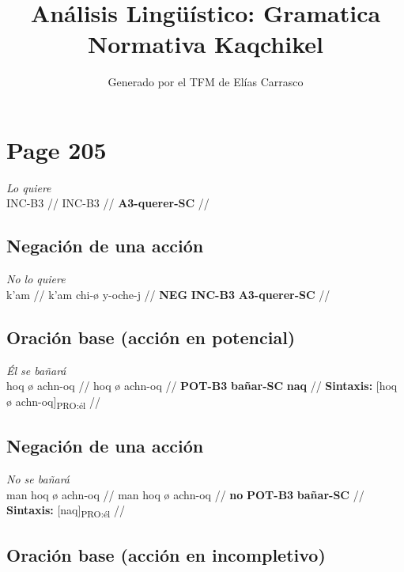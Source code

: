 \documentclass{article}%
\title{Análisis Lingüístico: Gramatica Normativa Kaqchikel}%
\author{Generado por el TFM de Elías Carrasco}%
\begin{document}
%
\normalsize%
\maketitle%
\section{Page 205}%
\label{sec:Page205}%
\par\medskip%
\ex
\textit{Lo quiere} \\
\begingl
\gla INC-B3 //
\glb INC-B3 //
\glc \textbf{A3-querer-SC} //
\endgl
\xe
%
\medskip%
\subsection{Negación de una acción}%
\label{subsec:Negacindeunaaccin}%

%
\par\medskip%
\ex
\textit{No lo quiere} \\
\begingl
\gla k'am //
\glb k'am chi-ø y-oche-j //
\glc \textbf{NEG} \textbf{INC-B3} \textbf{A3-querer-SC} //
\endgl
\xe
%
\medskip%
\subsection{Oración base (acción en potencial)}%
\label{subsec:Oracinbase(accinenpotencial)}%

%
\par\medskip%
\ex
\textit{Él se bañará} \\
\begingl
\gla hoq ø achn-oq //
\glb hoq ø achn-oq //
\glc \textbf{POT-B3} \textbf{bañar-SC} \textbf{naq} //
\glft \textbf{Sintaxis:} [hoq ø achn-oq]\textsubscript{PRO:él} //
\endgl
\xe
%
\medskip%
\subsection{Negación de una acción}%
\label{subsec:Negacindeunaaccin}%

%
\par\medskip%
\ex
\textit{No se bañará} \\
\begingl
\gla man hoq ø achn-oq //
\glb man hoq ø achn-oq //
\glc \textbf{no} \textbf{POT-B3} \textbf{bañar-SC} //
\glft \textbf{Sintaxis:} [naq]\textsubscript{PRO:él} //
\endgl
\xe
%
\medskip%
\subsection{Oración base (acción en incompletivo)}%
\label{subsec:Oracinbase(accinenincompletivo)}%
\end{document}

